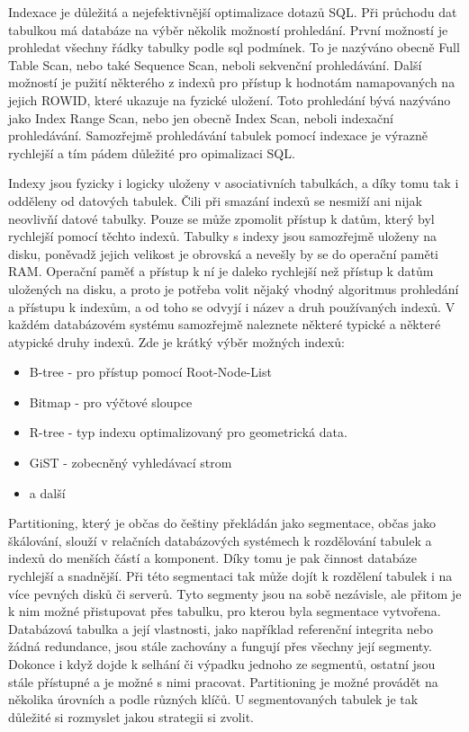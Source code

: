\documentclass[12pt]{article}
\begin{document}
Indexace je důležitá a nejefektivnější optimalizace dotazů SQL. Při průchodu dat tabulkou má databáze na výběr několik možností prohledání. První možností je prohledat všechny řádky tabulky podle sql podmínek. To je nazýváno obecně Full Table Scan, nebo také Sequence Scan, neboli sekvenční prohledávání. Další možností je pužití některého z indexů pro přístup k hodnotám namapovaných na jejich ROWID, které ukazuje na fyzické uložení. Toto prohledání bývá nazýváno jako Index Range Scan, nebo jen obecně Index Scan, neboli indexační prohledávání. Samozřejmě prohledávání tabulek pomocí indexace je výrazně rychlejší a tím pádem důležité pro opimalizaci SQL. \cite{optimalizace-sql}

Indexy jsou fyzicky i logicky uloženy v asociativních tabulkách, a díky tomu tak i odděleny od datových tabulek. Čili při smazání indexů se nesmiží ani nijak neovlivňí datové tabulky. Pouze se může zpomolit přístup k datům, který byl rychlejší pomocí těchto indexů. Tabulky s indexy jsou samozřejmě uloženy na disku, poněvadž jejich velikost je obrovská a nevešly by se do operační paměti RAM. Operační paměť a přístup k ní je daleko rychlejší než přístup k datům uložených na disku, a proto je potřeba volit nějaký vhodný algoritmus prohledání a přístupu k indexům, a od toho se odvyjí i název a druh používaných indexů. V každém databázovém systému samozřejmě naleznete některé typické a některé atypické druhy indexů. \cite{optimalizace-sql} Zde je krátký výběr možných indexů:

\begin{itemize}
\item B-tree - pro přístup pomocí Root-Node-List
\item Bitmap - pro výčtové sloupce
\item R-tree - typ indexu optimalizovaný pro geometrická data.
\item GiST - zobecněný vyhledávací strom
\item a další
\end{itemize}


Partitioning, který je občas do češtiny překládán jako segmentace, občas jako škálování, slouží v relačních databázových systémech k rozdělování tabulek a indexů do menších částí a komponent. Díky tomu je pak činnost databáze rychlejší a snadnější. Při této segmentaci tak může dojít k rozdělení tabulek i na více pevných disků či serverů. Tyto segmenty jsou na sobě nezávisle, ale přitom je k nim možné přistupovat přes tabulku, pro kterou byla segmentace vytvořena. Databázová tabulka a její vlastnosti, jako například referenční integrita nebo žádná redundance, jsou stále zachovány a fungují přes všechny její segmenty. Dokonce i když dojde k selhání či výpadku jednoho ze segmentů, ostatní jsou stále přístupné a je možné s nimi pracovat. Partitioning je možné provádět na několika úrovních a podle různých klíčů. U segmentovaných tabulek je tak důležité si rozmyslet jakou strategii si zvolit. 
\end{document}
